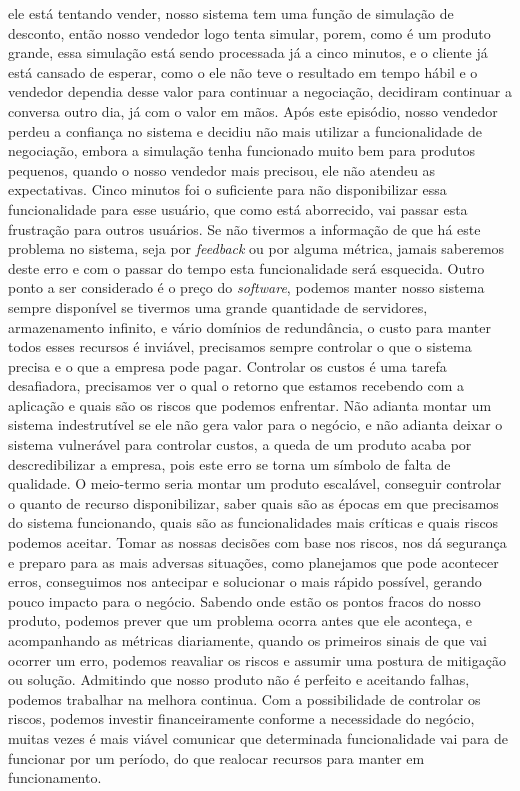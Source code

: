     ele está tentando vender, nosso sistema tem uma função de simulação de desconto,
    então nosso vendedor logo tenta simular, porem, como é um produto grande, essa
    simulação está sendo processada já a cinco minutos, e o cliente já está cansado
    de esperar, como o ele não teve o resultado em tempo hábil e o vendedor dependia
    desse valor para continuar a negociação, decidiram continuar a conversa outro dia,
    já com o valor em mãos. Após este episódio, nosso vendedor perdeu a confiança
    no sistema e decidiu não mais utilizar a funcionalidade de negociação, embora a
    simulação tenha funcionado muito bem para produtos pequenos, quando o nosso
    vendedor mais precisou, ele não atendeu as expectativas. Cinco minutos foi o
    suficiente para não disponibilizar essa funcionalidade para esse usuário, que
    como está aborrecido, vai passar esta frustração para outros usuários. Se não
    tivermos a informação de que há este problema no sistema, seja por \textit{feedback}
    ou por alguma métrica, jamais saberemos deste erro e com o passar do tempo
    esta funcionalidade será esquecida. \newline
    Outro ponto a ser considerado é o preço do \textit{software}, podemos manter
    nosso sistema sempre disponível se tivermos uma grande quantidade de servidores,
    armazenamento infinito, e vário domínios de redundância, o custo para manter
    todos esses recursos é inviável, precisamos sempre controlar o que o sistema
    precisa e o que a empresa pode pagar. Controlar os custos é uma tarefa
    desafiadora, precisamos ver o qual o retorno que estamos recebendo com a aplicação
    e quais são os riscos que podemos enfrentar. Não adianta montar um sistema
    indestrutível se ele não gera valor para o negócio, e não adianta deixar o
    sistema vulnerável para controlar custos, a queda de um produto acaba
    por descredibilizar a empresa, pois este erro se torna um símbolo de falta
    de qualidade. O meio-termo seria montar um produto escalável,
    conseguir controlar o quanto de recurso disponibilizar, saber quais são as
    épocas em que precisamos do sistema funcionando, quais são as funcionalidades
    mais críticas e quais riscos podemos aceitar. Tomar as nossas decisões com
    base nos riscos, nos dá segurança e preparo para as mais adversas situações,
    como planejamos que pode acontecer erros, conseguimos nos antecipar e solucionar
    o mais rápido possível, gerando pouco impacto para o negócio. Sabendo onde estão
    os pontos fracos do nosso produto, podemos prever que um problema ocorra antes
    que ele aconteça, e acompanhando as métricas diariamente, quando os primeiros
    sinais de que vai ocorrer um erro, podemos reavaliar os riscos e assumir uma
    postura de mitigação ou solução. Admitindo que nosso produto não é perfeito e
    aceitando falhas, podemos trabalhar na melhora continua. Com a possibilidade
    de controlar os riscos, podemos investir financeiramente conforme a necessidade
    do negócio, muitas vezes é mais viável comunicar que determinada funcionalidade
    vai para de funcionar por um período, do que realocar recursos para manter em
    funcionamento.

